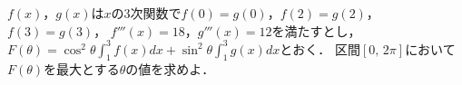 \documentclass[../../main.tex]{subfiles}
\begin{document}
$f(x)$，$g(x)$は$x$の3次関数で$f(0)=g(0)$，$f(2)=g(2)$，$f(3)=g(3)$，
$f'''(x)=18$，$g'''(x)=12$を満たすとし，
$\displaystyle F(\theta)=\cos^2\theta\int_1^3f(x)dx+\sin^2\theta\int_1^3g(x)dx$とおく．
区間$[0, \, 2\pi]$において$F(\theta)$を最大とする$\theta$の値を求めよ．
\end{document}
